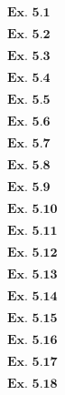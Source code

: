 \documentclass{article}
\begin{document}
${\textbf{Ex. 5.1}}$

\vspace{0.2in}
${\textbf{Ex. 5.2}}$

\vspace{0.2in}
${\textbf{Ex. 5.3}}$

\vspace{0.2in}
${\textbf{Ex. 5.4}}$

\vspace{0.2in}
${\textbf{Ex. 5.5}}$

\vspace{0.2in}
${\textbf{Ex. 5.6}}$

\vspace{0.2in}
${\textbf{Ex. 5.7}}$

\vspace{0.2in}
${\textbf{Ex. 5.8}}$

\vspace{0.2in}
${\textbf{Ex. 5.9}}$

\vspace{0.2in}
${\textbf{Ex. 5.10}}$

\vspace{0.2in}
${\textbf{Ex. 5.11}}$

\vspace{0.2in}
${\textbf{Ex. 5.12}}$

\vspace{0.2in}
${\textbf{Ex. 5.13}}$

\vspace{0.2in}
${\textbf{Ex. 5.14}}$

\vspace{0.2in}
${\textbf{Ex. 5.15}}$

\vspace{0.2in}
${\textbf{Ex. 5.16}}$

\vspace{0.2in}
${\textbf{Ex. 5.17}}$

\vspace{0.2in}
${\textbf{Ex. 5.18}}$
\end{document}
